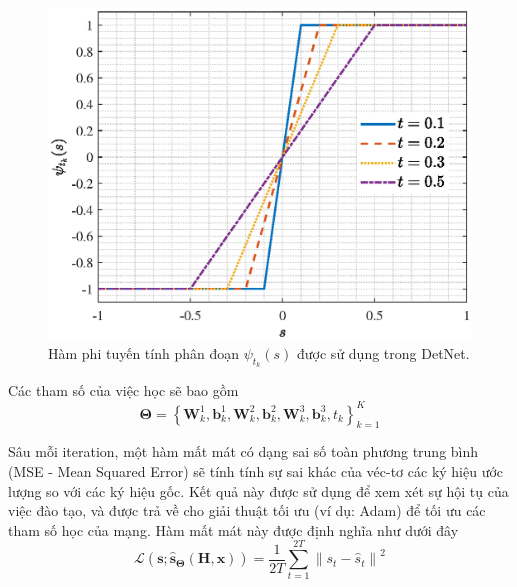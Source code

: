 \begin{figure}[ht]
    \centering
    \includegraphics[width=.8\linewidth]{figures/soft_sign.eps}
    \caption{Hàm phi tuyến tính phân đoạn $\psi_{t_k}(s)$ được sử dụng trong DetNet.}
    \label{fig:soft_sign}
\end{figure}
Các tham số của việc học sẽ bao gồm 
\begin{equation}
\boldsymbol{\Theta}=\left\{\mathbf{W}^1_{k}, \mathbf{b}^1_{k}, \mathbf{W}^2_{k}, \mathbf{b}^2_{k}, \mathbf{W}^3_{k}, \mathbf{b}^3_{ k}, t_k\right\}_{k=1}^K
\end{equation}

Sâu mỗi iteration, một hàm mất mát có dạng sai số toàn phương trung bình (MSE - Mean Squared Error) sẽ tính tính sự sai khác của véc-tơ các ký hiệu ước lượng so với các ký hiệu gốc. Kết quả này được sử dụng để xem xét sự hội tụ của việc đào tạo, và được trả về cho giải thuật tối ưu (ví dụ: Adam) để tối ưu các tham số học của mạng. Hàm mất mát này được định nghĩa như dưới đây
\begin{equation}
\label{eq:lossdetnet}
    \mathcal{L}(\mathbf{s} ; \hat{\mathbf{s}}_{\boldsymbol{\Theta}}(\mathbf{H}, \mathbf{x}))= \frac{1}{2T} \sum_{t=1}^{2T} {\left\| s_t-\hat{s}_t\right\|^2}
\end{equation}

